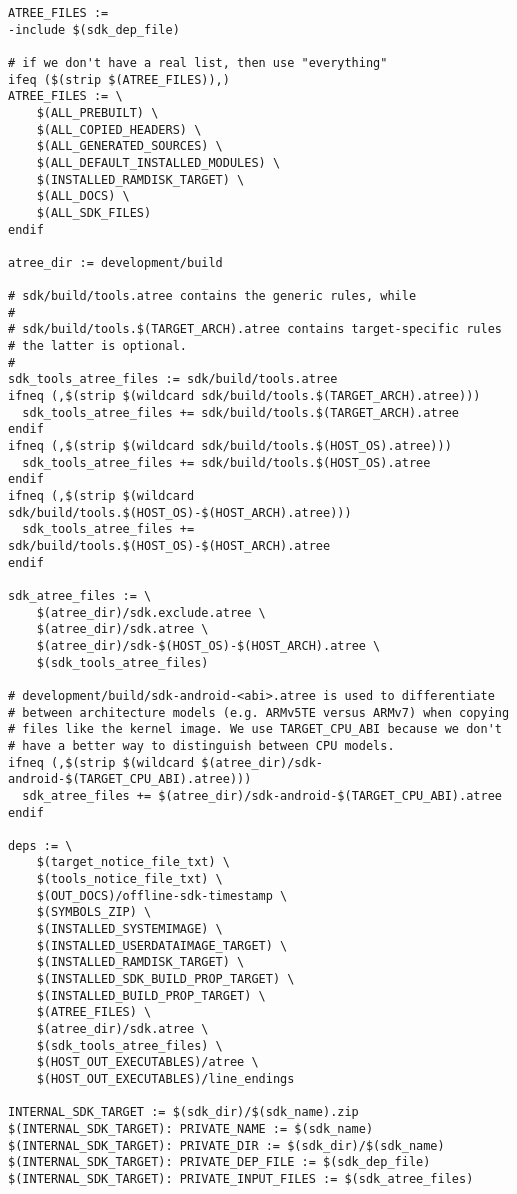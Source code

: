 \documentclass[12pt,a4paper]{article}
\begin{document}
\begin{verbatim}
ATREE_FILES :=
-include $(sdk_dep_file)

# if we don't have a real list, then use "everything"
ifeq ($(strip $(ATREE_FILES)),)
ATREE_FILES := \
	$(ALL_PREBUILT) \
	$(ALL_COPIED_HEADERS) \
	$(ALL_GENERATED_SOURCES) \
	$(ALL_DEFAULT_INSTALLED_MODULES) \
	$(INSTALLED_RAMDISK_TARGET) \
	$(ALL_DOCS) \
	$(ALL_SDK_FILES)
endif

atree_dir := development/build

# sdk/build/tools.atree contains the generic rules, while
#
# sdk/build/tools.$(TARGET_ARCH).atree contains target-specific rules
# the latter is optional.
#
sdk_tools_atree_files := sdk/build/tools.atree
ifneq (,$(strip $(wildcard sdk/build/tools.$(TARGET_ARCH).atree)))
  sdk_tools_atree_files += sdk/build/tools.$(TARGET_ARCH).atree
endif
ifneq (,$(strip $(wildcard sdk/build/tools.$(HOST_OS).atree)))
  sdk_tools_atree_files += sdk/build/tools.$(HOST_OS).atree
endif
ifneq (,$(strip $(wildcard sdk/build/tools.$(HOST_OS)-$(HOST_ARCH).atree)))
  sdk_tools_atree_files += sdk/build/tools.$(HOST_OS)-$(HOST_ARCH).atree
endif

sdk_atree_files := \
	$(atree_dir)/sdk.exclude.atree \
	$(atree_dir)/sdk.atree \
	$(atree_dir)/sdk-$(HOST_OS)-$(HOST_ARCH).atree \
	$(sdk_tools_atree_files)

# development/build/sdk-android-<abi>.atree is used to differentiate
# between architecture models (e.g. ARMv5TE versus ARMv7) when copying
# files like the kernel image. We use TARGET_CPU_ABI because we don't
# have a better way to distinguish between CPU models.
ifneq (,$(strip $(wildcard $(atree_dir)/sdk-android-$(TARGET_CPU_ABI).atree)))
  sdk_atree_files += $(atree_dir)/sdk-android-$(TARGET_CPU_ABI).atree
endif

deps := \
	$(target_notice_file_txt) \
	$(tools_notice_file_txt) \
	$(OUT_DOCS)/offline-sdk-timestamp \
	$(SYMBOLS_ZIP) \
	$(INSTALLED_SYSTEMIMAGE) \
	$(INSTALLED_USERDATAIMAGE_TARGET) \
	$(INSTALLED_RAMDISK_TARGET) \
	$(INSTALLED_SDK_BUILD_PROP_TARGET) \
	$(INSTALLED_BUILD_PROP_TARGET) \
	$(ATREE_FILES) \
	$(atree_dir)/sdk.atree \
	$(sdk_tools_atree_files) \
	$(HOST_OUT_EXECUTABLES)/atree \
    $(HOST_OUT_EXECUTABLES)/line_endings

INTERNAL_SDK_TARGET := $(sdk_dir)/$(sdk_name).zip
$(INTERNAL_SDK_TARGET): PRIVATE_NAME := $(sdk_name)
$(INTERNAL_SDK_TARGET): PRIVATE_DIR := $(sdk_dir)/$(sdk_name)
$(INTERNAL_SDK_TARGET): PRIVATE_DEP_FILE := $(sdk_dep_file)
$(INTERNAL_SDK_TARGET): PRIVATE_INPUT_FILES := $(sdk_atree_files)


\end{verbatim}
\end{document}
